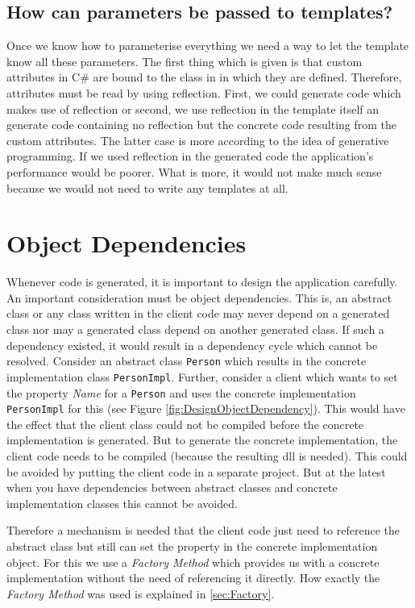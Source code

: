 		\subsection{How can parameters be passed to templates?}
			Once we know how to parameterise everything we need a way to let the 
			template know all these parameters. The first thing which is given is that
			custom attributes in C\# are bound to the class in in which they are defined.
			Therefore, attributes must be read by using reflection. First, we could
			generate code which makes use of reflection or second, we use reflection
			in the template itself an generate code containing no reflection but the 
			concrete code resulting from the custom attributes. The latter case is more
			according to the idea of generative programming. If we used reflection
			in the generated code the application's performance would be poorer. What is more,
			it would not make much sense because we would not need to write any templates
			at all.
								
	\section{Object Dependencies}
		Whenever code is generated, it is important to design the application carefully.
		An important consideration must be object dependencies. This is, an abstract class or any
		class written in the client code
		may never depend on a generated class nor may a generated class depend on
		another generated class. If such a dependency existed, it would result in a dependency
		cycle which cannot be resolved. Consider an abstract class \verb~Person~ which results
		in the concrete implementation class \verb~PersonImpl~. Further, consider a client 
		which wants to set the property \textit{Name} for a \verb~Person~ and uses the concrete
		implementation \verb~PersonImpl~ for this (see Figure \ref{fig:DesignObjectDependency}). This
		would have the effect that the client class could not be compiled before the concrete
		implementation is generated. But to generate the concrete implementation, the client code
		needs to be compiled (because the resulting dll is needed). This could be avoided by putting
		the client code in a separate project. But at the latest when you have dependencies between
		abstract classes and concrete implementation classes this cannot be avoided.
		
		Therefore a mechanism is needed that the client code just need to reference the 
		abstract class but still can set the property in the concrete implementation object.
		For this we use a \textit{Factory Method} which provides us with a concrete implementation without
		the need of referencing it directly. How exactly the \textit{Factory Method} was used is explained
		in \ref{sec:Factory}.
		

